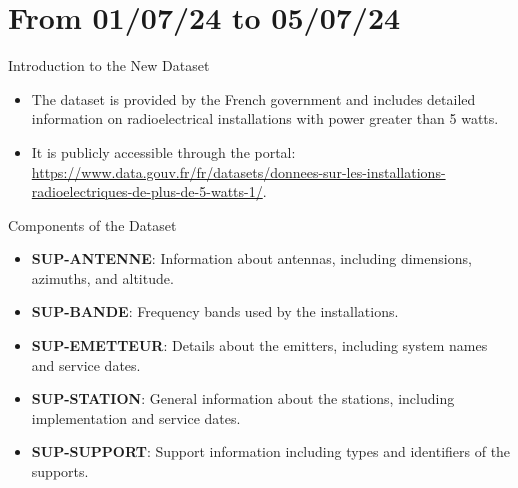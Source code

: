 \smallframetitle

\section{From 01/07/24 to 05/07/24}
\insertsectionframe

\begin{frame}{Introduction to the New Dataset}
    \begin{itemize}
        \item The dataset is provided by the French government and includes detailed information on radioelectrical installations with power greater than 5 watts.
        \item It is publicly accessible through the portal: \url{https://www.data.gouv.fr/fr/datasets/donnees-sur-les-installations-radioelectriques-de-plus-de-5-watts-1/}.
    \end{itemize}
    \begin{block}{Components of the Dataset}
        \begin{itemize}
            \item \textbf{SUP-ANTENNE}: Information about antennas, including dimensions, azimuths, and altitude.
            \item \textbf{SUP-BANDE}: Frequency bands used by the installations.
            \item \textbf{SUP-EMETTEUR}: Details about the emitters, including system names and service dates.
            \item \textbf{SUP-STATION}: General information about the stations, including implementation and service dates.
            \item \textbf{SUP-SUPPORT}: Support information including types and identifiers of the supports.
        \end{itemize}
    \end{block}
\end{frame}
    

